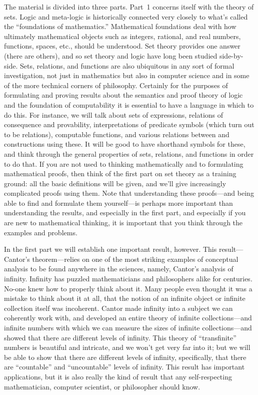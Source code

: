 The material is divided into three parts.  Part~1 concerns
itself with the theory of sets.  Logic and meta-logic is historically
connected very closely to what's called the ``foundations of
mathematics.''  Mathematical foundations deal with how ultimately
mathematical objects such as integers, rational, and real numbers,
functions, spaces, etc., should be understood.  Set theory provides
one answer (there are others), and so set theory and logic have long
been studied side-by-side.  Sets, relations, and functions are also
ubiquitous in any sort of formal investigation, not just in
mathematics but also in computer science and in some of the more
technical corners of philosophy.  Certainly for the purposes of
formulating and proving results about the semantics and proof theory
of logic and the foundation of computability it is essential to have a
language in which to do this.  For instance, we will talk about sets
of expressions, relations of consequence and provability,
interpretations of predicate symbols (which turn out to be relations),
computable functions, and various relations between and constructions
using these.  It will be good to have shorthand symbols for
these, and think through the general properties of sets, relations,
and functions in order to do that.  If you are not used to thinking
mathematically and to formulating mathematical proofs, then think of
the first part on set theory as a training ground: all the basic
definitions will be given, and we'll give increasingly complicated
proofs using them.  Note that understanding these proofs---and being
able to find and formulate them yourself---is perhaps more important
than understanding the results, and especially in the first part, and
especially if you are new to mathematical thinking, it is important
that you think through the examples and problems.

In the first part we will establish one important result, however.
This result---Cantor's theorem---relies on one of the most striking
examples of conceptual analysis to be found anywhere in the sciences,
namely, Cantor's analysis of infinity.  Infinity has puzzled
mathematicians and philosophers alike for centuries. No-one knew how
to properly think about it. Many people even thought it was a mistake
to think about it at all, that the notion of an infinite object or
infinite collection itself was incoherent.  Cantor made infinity into
a subject we can coherently work with, and developed an entire theory
of infinite collections---and infinite numbers with which we can
measure the sizes of infinite collections---and showed that there are
different levels of infinity.  This theory of ``transfinite'' numbers
is beautiful and intricate, and we won't get very far into it; but we
will be able to show that there are different levels of infinity,
specifically, that there are ``countable'' and ``uncountable'' levels
of infinity.  This result has important applications, but it is
also really the kind of result that any self-respecting mathematician,
computer scientist, or philosopher should know.

